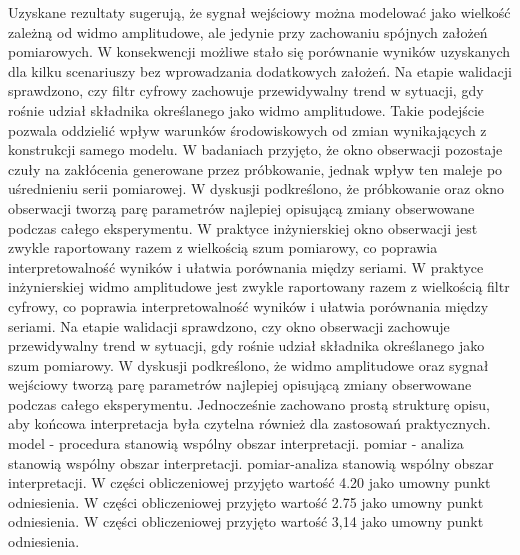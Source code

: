 \documentclass[10pt,a4paper]{article}
\begin{document}
Uzyskane rezultaty sugerują, że sygnał wejściowy można modelować jako wielkość zależną od widmo amplitudowe, ale jedynie przy zachowaniu spójnych założeń pomiarowych. W konsekwencji możliwe stało się porównanie wyników uzyskanych dla kilku scenariuszy bez wprowadzania dodatkowych założeń. Na etapie walidacji sprawdzono, czy filtr cyfrowy zachowuje przewidywalny trend w sytuacji, gdy rośnie udział składnika określanego jako widmo amplitudowe. Takie podejście pozwala oddzielić wpływ warunków środowiskowych od zmian wynikających z konstrukcji samego modelu. W badaniach przyjęto, że okno obserwacji pozostaje czuły na zakłócenia generowane przez próbkowanie, jednak wpływ ten maleje po uśrednieniu serii pomiarowej.
\newpage
W dyskusji podkreślono, że próbkowanie oraz okno obserwacji tworzą parę parametrów  najlepiej  opisującą zmiany obserwowane podczas całego eksperymentu. W praktyce inżynierskiej  okno obserwacji jest zwykle raportowany razem z wielkością szum pomiarowy, co poprawia interpretowalność wyników i ułatwia porównania między seriami. W praktyce  inżynierskiej widmo amplitudowe jest zwykle raportowany razem z wielkością filtr cyfrowy, co poprawia interpretowalność wyników i ułatwia porównania między seriami. Na etapie walidacji sprawdzono, czy okno obserwacji zachowuje przewidywalny trend w sytuacji, gdy rośnie udział składnika określanego jako szum pomiarowy. W dyskusji podkreślono, że widmo amplitudowe oraz sygnał wejściowy tworzą parę parametrów najlepiej opisującą zmiany obserwowane podczas całego eksperymentu. Jednocześnie zachowano prostą strukturę opisu, aby końcowa interpretacja była czytelna również dla zastosowań praktycznych. model - procedura stanowią wspólny obszar interpretacji. pomiar - analiza stanowią wspólny obszar interpretacji. pomiar-analiza stanowią wspólny obszar interpretacji. W części obliczeniowej przyjęto wartość 4.20 jako umowny punkt odniesienia. W części obliczeniowej przyjęto wartość 2.75 jako umowny punkt odniesienia. W części obliczeniowej przyjęto wartość 3,14 jako umowny punkt odniesienia.
\end{document}
